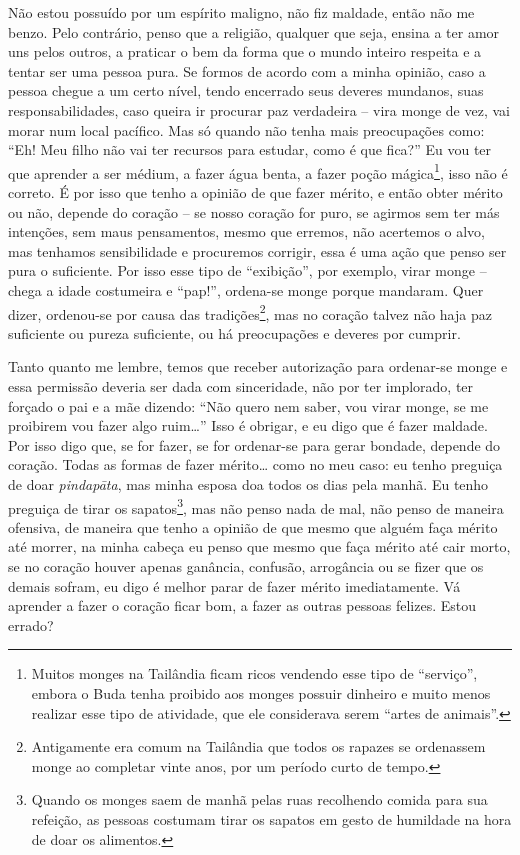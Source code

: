 Não estou possuído por um espírito maligno, não fiz maldade, então
não me benzo. Pelo contrário, penso que a religião, qualquer que seja,
ensina a ter amor uns pelos outros, a praticar o bem da forma que o
mundo inteiro respeita e a tentar ser uma pessoa pura. Se formos de
acordo com a minha opinião, caso a pessoa chegue a um certo nível,
tendo encerrado seus deveres mundanos, suas responsabilidades, caso
queira ir procurar paz verdadeira – vira monge de vez, vai morar num
local pacífico. Mas só quando não tenha mais preocupações como: “Eh!
Meu filho não vai ter recursos para estudar, como é que fica?” Eu vou
ter que aprender a ser médium, a fazer água benta, a fazer poção
mágica\footnote{Muitos monges na Tailândia ficam ricos vendendo esse
tipo de “serviço”, embora o Buda tenha proibido aos monges possuir
dinheiro e muito menos realizar esse tipo de atividade, que ele
considerava serem “artes de animais”. }, isso não é correto. É por isso
que tenho a opinião de que fazer mérito, e então obter mérito ou não,
depende do coração – se nosso coração for puro, se agirmos sem ter más
intenções, sem maus pensamentos, mesmo que erremos, não acertemos o
alvo, mas tenhamos sensibilidade e procuremos corrigir, essa é uma ação
que penso ser pura o suficiente. Por isso esse tipo de “exibição”, por
exemplo, virar monge – chega a idade costumeira e “pap!”, ordena-se
monge porque mandaram. Quer dizer, ordenou-se por causa das
tradições\footnote{Antigamente era comum na Tailândia que todos os
rapazes se ordenassem monge ao completar vinte anos, por um período
curto de tempo.}, mas no coração talvez não haja paz suficiente ou
pureza suficiente, ou há preocupações e deveres por cumprir. 

Tanto quanto me lembre, temos que receber autorização para
ordenar-se monge e essa permissão deveria ser dada com sinceridade, não
por ter implorado, ter forçado o pai e a mãe dizendo: “Não quero nem
saber, vou virar monge, se me proibirem vou fazer algo ruim…” Isso é
obrigar, e eu digo que é fazer maldade. Por isso digo que, se for
fazer, se for ordenar-se para gerar bondade, depende do coração. Todas
as formas de fazer mérito… como no meu caso: eu tenho preguiça de doar
\textit{pindap\=ata}, mas minha esposa doa todos os dias pela manhã. Eu
tenho preguiça de tirar os sapatos\footnote{Quando os monges saem de
manhã pelas ruas recolhendo comida para sua refeição, as pessoas
costumam tirar os sapatos em gesto de humildade na hora de doar os
alimentos.}, mas não penso nada de mal, não penso de maneira ofensiva,
de maneira que tenho a opinião de que mesmo que alguém faça mérito até
morrer, na minha cabeça eu penso que mesmo que faça mérito até cair
morto, se no coração houver apenas ganância, confusão, arrogância ou se
fizer que os demais sofram, eu digo é melhor parar de fazer mérito
imediatamente. Vá aprender a fazer o coração ficar bom, a fazer as
outras pessoas felizes. Estou errado?

